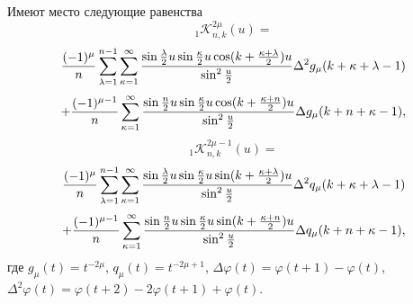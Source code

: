 \begin{lemma}\label{l2.4}
Имеют место следующие равенства
 $$
 _1\mathcal{ K}_{n,k}^{2\mu}(u)=
 $$
 $$
 {(-1)^\mu\over n}\sum\limits_{\lambda=1}^{n-1}
\sum\limits_{\kappa=1}^{\infty}\frac{\sin\frac{\lambda}{2}u\sin\frac{\kappa}{2}u
\cos(k+\frac{\kappa+\lambda}{2})u}{\sin^2\frac u2}\Delta^2g_\mu(k+\kappa+\lambda-1)
$$
 \begin{equation}\label{2.26}
    +{(-1)^{\mu-1}\over n}\sum\limits_{\kappa=1}^{\infty}
\frac{\sin\frac {n}{2}u\sin\frac{\kappa}{2}u\cos(k+\frac{\kappa+n}{2})u}{\sin^2\frac u2}
\Delta g_\mu(k+n+\kappa-1),
 \end{equation}
 $$
 _1\mathcal{ K}_{n,k}^{2\mu-1}(u)=
 $$
 $$
 {(-1)^\mu\over n}\sum\limits_{\lambda=1}^{n-1}
\sum\limits_{\kappa=1}^{\infty}\frac{\sin\frac{\lambda}{2}u\sin\frac{\kappa}{2}u
\sin(k+\frac{\kappa+\lambda}{2})u}{\sin^2\frac u2}\Delta^2q_\mu(k+\kappa+\lambda-1)
$$
 \begin{equation}\label{2.27}
    +{(-1)^{\mu-1}\over n}\sum\limits_{\kappa=1}^{\infty}
\frac{\sin\frac {n}{2}u\sin\frac{\kappa}{2}u\sin(k+\frac{\kappa+n}{2})u}{\sin^2\frac u2}
\Delta q_\mu(k+n+\kappa-1),
 \end{equation}
 где $g_\mu(t)=t^{-2\mu}$, $q_\mu(t)=t^{-2\mu+1}$, $\Delta\varphi(t)=\varphi(t+1)-\varphi(t)$,
 $\Delta^2\varphi(t)=\varphi(t+2)-2\varphi(t+1)+\varphi(t)$.
\end{lemma}
